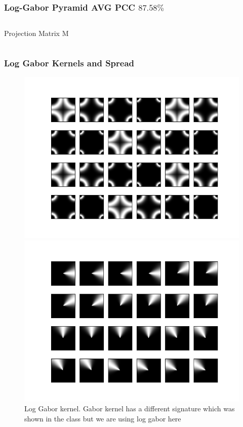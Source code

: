 \documentclass[11pt]{beamer}
\begin{document}
\begin{frame}
\begin{frame}
\frametitle{Log-Gabor Pyramid AVG PCC {$87.58\%$}}
\begin{columns}[T] %
\begin{column}{.8\textwidth}
\begin{table}
	\caption{Projection Matrix M}
\end{table}
\end{column}
\end{columns}
\end{frame}

\begin{frame}
\frametitle{Log Gabor Kernels and Spread}
\begin{figure}
\centering
\includegraphics[height=.4\textheight]{loggabor.png}\vfill
\caption{Log Gabor kernel. Gabor kernel has a different signature which was shown in the class but we are using log gabor here}
\includegraphics[height=.3\textheight]{spread.png}

\end{figure}
\end{frame}
\end{frame}
\end{document}
